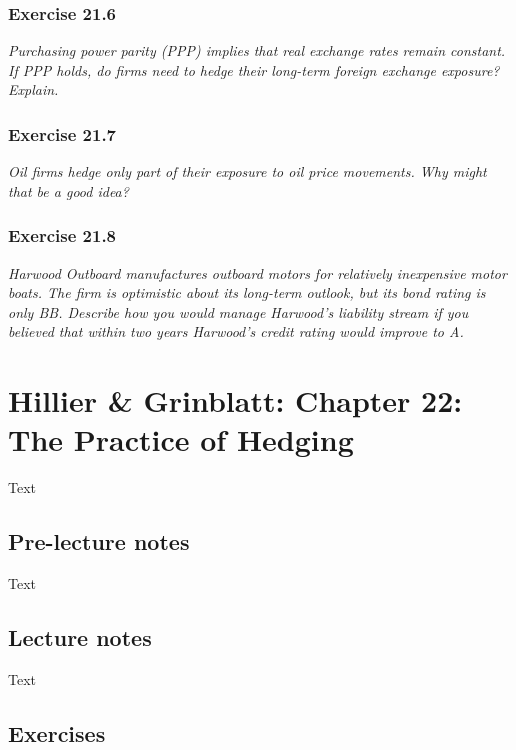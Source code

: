 \documentclass[]{book}
\theoremstyle{definition}
\theoremstyle{definition}
\theoremstyle{remark}
\begin{document}
\subsection{Exercise 21.6}\label{exercise-21.6}

\emph{Purchasing power parity (PPP) implies that real exchange rates
remain constant. If PPP holds, do firms need to hedge their long-term
foreign exchange exposure? Explain.} \citep[p.712]{book}

\subsection{Exercise 21.7}\label{exercise-21.7}

\emph{Oil firms hedge only part of their exposure to oil price
movements. Why might that be a good idea?} \citep[p.712]{book}

\subsection{Exercise 21.8}\label{exercise-21.8}

\emph{Harwood Outboard manufactures outboard motors for relatively
inexpensive motor boats. The firm is optimistic about its long-term
outlook, but its bond rating is only BB. Describe how you would manage
Harwood's liability stream if you believed that within two years
Harwood's credit rating would improve to A.} \citep[p.712]{book}

\chapter{Hillier \& Grinblatt: Chapter 22: The Practice of
Hedging}\label{hillier-grinblatt-chapter-22-the-practice-of-hedging}

Text

\section{Pre-lecture notes}\label{pre-lecture-notes-22}

Text

\section{Lecture notes}\label{lecture-notes-22}

Text

\section{Exercises}\label{exercises-22}
\end{document}
